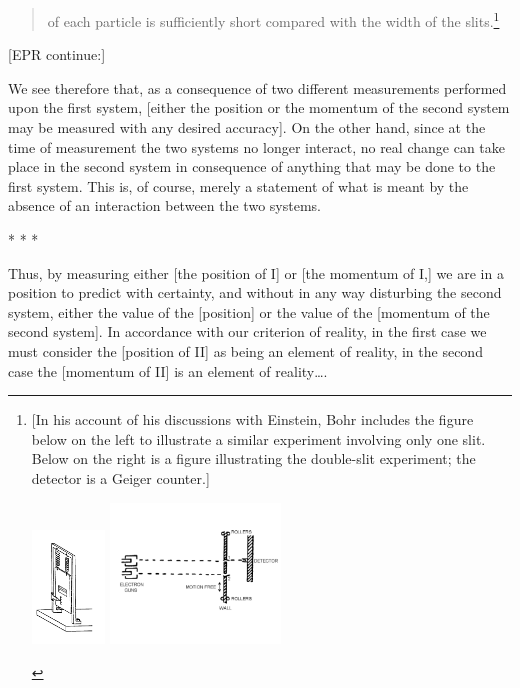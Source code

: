 \begin{quote}
of each particle is sufficiently short compared with the width of the
slits.\footnote{{[}In his account of his discussions with Einstein, Bohr
  includes the figure below on the left to illustrate a similar
  experiment involving only one slit. Below on the right is a figure
  illustrating the double-slit experiment; the detector is a Geiger
  counter.{]}
\begin{center}
\includegraphics[width=0.76944in,height=1.19236in]{images/16_epr/image017.png}
\includegraphics[width=1.77833in,height=1.475in]{images/16_epr/image019.png}
\end{center}
}
\end{quote}

[EPR continue:]

We see therefore that, as a consequence of two different measurements
performed upon the first system, {[}either the position or the momentum
of the second system may be measured with any desired accuracy{]}. On
the other hand, since at the time of measurement the two systems no
longer interact, no real change can take place in the second system in
consequence of anything that may be done to the first system. This is,
of course, merely a statement of what is meant by the absence of an
interaction between the two systems.\\
\centerline{* * *}
%
Thus, by measuring either {[}the position of I{]} or {[}the momentum of
I,{]} we are in a position to predict with certainty, and without in any
way disturbing the second system, either the value of the {[}position{]}
or the value of the {[}momentum of the second system{]}. In accordance
with our criterion of reality, in the first case we must consider the
{[}position of II{]} as being an element of reality, in the second case
the {[}momentum of II{]} is an element of reality\ldots.

